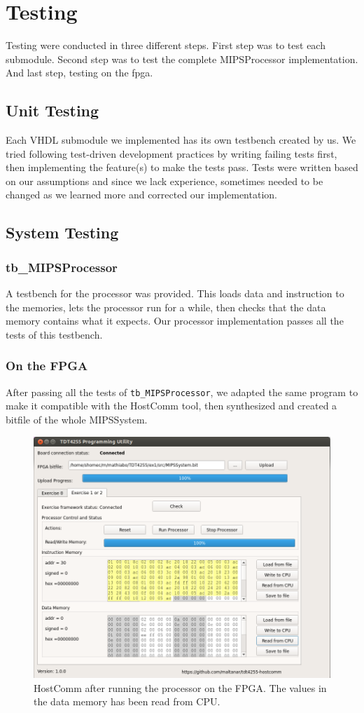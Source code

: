 \section{Testing}

Testing were conducted in three different steps.
First step was to test each submodule.
Second step was to test the complete MIPSProcessor implementation.
And last step, testing on the \gls{fpga}.

\subsection{Unit Testing}
Each VHDL submodule we implemented has its own testbench created by us.
We tried following test-driven development practices by writing failing tests first, then implementing the feature(s) to make the tests pass.
Tests were written based on our assumptions and since we lack experience,
sometimes needed to be changed as we learned more and corrected our implementation.

\subsection{System Testing}
\subsubsection{tb\_MIPSProcessor}
A testbench for the processor was provided.
This loads data and instruction to the memories,
lets the processor run for a while,
then checks that the data memory contains what it expects.
Our processor implementation passes all the tests of this testbench.

\subsubsection{On the FPGA}
After passing all the tests of \texttt{tb\_MIPSProcessor},
we adapted the same program to make it compatible with the HostComm tool,
then synthesized and created a bitfile of the whole MIPSSystem.

\begin{figure}[h]
    \centering
    \includegraphics[width=\textwidth]{img/Hostcomm}
    \caption{HostComm after running the processor on the FPGA. The values in the data memory has been read from CPU.}
    \label{fig:hostcomm}
\end{figure}
